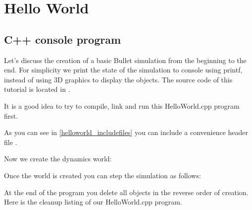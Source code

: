 \chapter{Hello World}
\section{C++ console program}
Let's discuss the creation of a basic Bullet simulation from the beginning to the end. For simplicity we print the state of the simulation to console using printf, instead of using 3D graphics to display the objects. The source code of this tutorial is located in . 

It is a good idea to try to compile, link and run this HelloWorld.cpp program first.

As you can see in \ref{helloworld_includefiles} you can include a convenience header file .


Now we create the dynamics world:

Once the world is created you can step the simulation as follows:

At the end of the program you delete all objects in the reverse order of creation. Here is the cleanup listing of our HelloWorld.cpp program.

